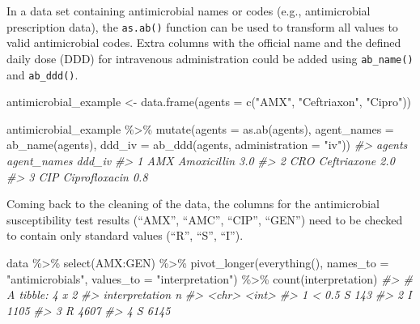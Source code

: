 \documentclass[
]{book}
\newenvironment{Shaded}{\begin{snugshade}}{\end{snugshade}}
\newcommand{\AttributeTok}[1]{\textcolor[rgb]{0.77,0.63,0.00}{#1}}
\newcommand{\CommentTok}[1]{\textcolor[rgb]{0.56,0.35,0.01}{\textit{#1}}}
\newcommand{\FunctionTok}[1]{\textcolor[rgb]{0.00,0.00,0.00}{#1}}
\newcommand{\NormalTok}[1]{#1}
\newcommand{\OtherTok}[1]{\textcolor[rgb]{0.56,0.35,0.01}{#1}}
\newcommand{\SpecialCharTok}[1]{\textcolor[rgb]{0.00,0.00,0.00}{#1}}
\newcommand{\StringTok}[1]{\textcolor[rgb]{0.31,0.60,0.02}{#1}}
\begin{document}
In a data set containing antimicrobial names or codes (e.g., antimicrobial prescription data), the \texttt{as.ab()} function can be used to transform all values to valid antimicrobial codes. Extra columns with the official name and the defined daily dose (DDD) for intravenous administration could be added using \texttt{ab\_name()} and \texttt{ab\_ddd()}.

\begin{Shaded}
\begin{Highlighting}[]
\NormalTok{antimicrobial\_example }\OtherTok{\textless{}{-}} \FunctionTok{data.frame}\NormalTok{(}\AttributeTok{agents =} \FunctionTok{c}\NormalTok{(}\StringTok{"AMX"}\NormalTok{,}
                                               \StringTok{"Ceftriaxon"}\NormalTok{,}
                                               \StringTok{"Cipro"}\NormalTok{))}

\NormalTok{antimicrobial\_example }\SpecialCharTok{\%\textgreater{}\%} 
  \FunctionTok{mutate}\NormalTok{(}\AttributeTok{agents =} \FunctionTok{as.ab}\NormalTok{(agents), }
         \AttributeTok{agent\_names =} \FunctionTok{ab\_name}\NormalTok{(agents),}
         \AttributeTok{ddd\_iv =} \FunctionTok{ab\_ddd}\NormalTok{(agents, }\AttributeTok{administration =} \StringTok{"iv"}\NormalTok{))}
\CommentTok{\#\textgreater{} agents agent\_names ddd\_iv}
\CommentTok{\#\textgreater{} 1 AMX Amoxicillin 3.0}
\CommentTok{\#\textgreater{} 2 CRO Ceftriaxone 2.0}
\CommentTok{\#\textgreater{} 3 CIP Ciprofloxacin 0.8}
\end{Highlighting}
\end{Shaded}

Coming back to the cleaning of the data, the columns for the antimicrobial susceptibility test results (``AMX'', ``AMC'', ``CIP'', ``GEN'') need to be checked to contain only standard values (``R'', ``S'', ``I'').

\begin{Shaded}
\begin{Highlighting}[]
\NormalTok{data }\SpecialCharTok{\%\textgreater{}\%}
  \FunctionTok{select}\NormalTok{(AMX}\SpecialCharTok{:}\NormalTok{GEN) }\SpecialCharTok{\%\textgreater{}\%}
  \FunctionTok{pivot\_longer}\NormalTok{(}\FunctionTok{everything}\NormalTok{(),}
               \AttributeTok{names\_to =} \StringTok{"antimicrobials"}\NormalTok{,}
               \AttributeTok{values\_to =} \StringTok{"interpretation"}\NormalTok{) }\SpecialCharTok{\%\textgreater{}\%}
  \FunctionTok{count}\NormalTok{(interpretation)}
\CommentTok{\#\textgreater{} \# A tibble: 4 x 2}
\CommentTok{\#\textgreater{}   interpretation     n}
\CommentTok{\#\textgreater{}   \textless{}chr\textgreater{}          \textless{}int\textgreater{}}
\CommentTok{\#\textgreater{} 1 \textless{} 0.5 S          143}
\CommentTok{\#\textgreater{} 2 I               1105}
\CommentTok{\#\textgreater{} 3 R               4607}
\CommentTok{\#\textgreater{} 4 S               6145}
\end{Highlighting}
\end{Shaded}
\end{document}
